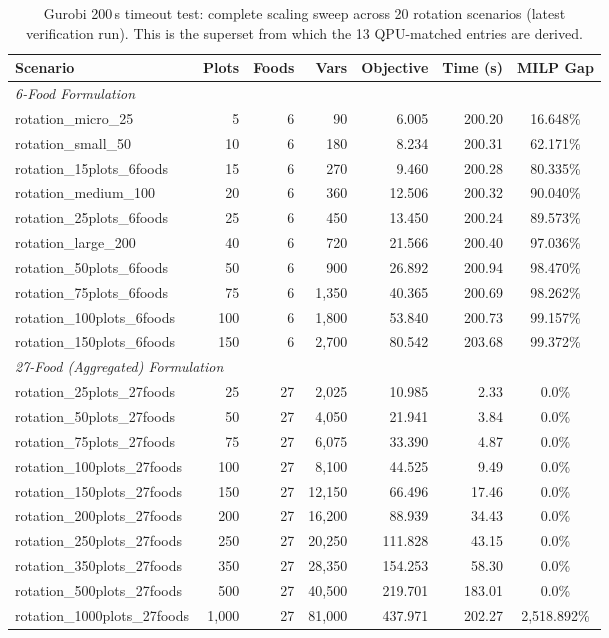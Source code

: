 \documentclass{oqireport}
\begin{document}
\begin{table}[H]
\centering
\caption{Gurobi 200\,s timeout test: complete scaling sweep across 20 rotation scenarios (latest verification run). This is the superset from which the 13 QPU-matched entries are derived.}
\label{tab:gurobi_300s_full}
\small
\begin{adjustbox}{max width=\textwidth}
\begin{tabular}{l r r r r r c}
\toprule
\textbf{Scenario} & \textbf{Plots} & \textbf{Foods} & \textbf{Vars} & \textbf{Objective} & \textbf{Time (s)} & \textbf{MILP Gap} \\
\midrule
\multicolumn{7}{l}{\textit{6-Food Formulation}} \\
\midrule
rotation\_micro\_25 & 5 & 6 & 90 & 6.005 & 200.20 & 16.648\% \\
rotation\_small\_50 & 10 & 6 & 180 & 8.234 & 200.31 & 62.171\% \\
rotation\_15plots\_6foods & 15 & 6 & 270 & 9.460 & 200.28 & 80.335\% \\
rotation\_medium\_100 & 20 & 6 & 360 & 12.506 & 200.32 & 90.040\% \\
rotation\_25plots\_6foods & 25 & 6 & 450 & 13.450 & 200.24 & 89.573\% \\
rotation\_large\_200 & 40 & 6 & 720 & 21.566 & 200.40 & 97.036\% \\
rotation\_50plots\_6foods & 50 & 6 & 900 & 26.892 & 200.94 & 98.470\% \\
rotation\_75plots\_6foods & 75 & 6 & 1,350 & 40.365 & 200.69 & 98.262\% \\
rotation\_100plots\_6foods & 100 & 6 & 1,800 & 53.840 & 200.73 & 99.157\% \\
rotation\_150plots\_6foods & 150 & 6 & 2,700 & 80.542 & 203.68 & 99.372\% \\
\midrule
\multicolumn{7}{l}{\textit{27-Food (Aggregated) Formulation}} \\
\midrule
rotation\_25plots\_27foods & 25 & 27 & 2,025 & 10.985 & 2.33 & 0.0\% \\
rotation\_50plots\_27foods & 50 & 27 & 4,050 & 21.941 & 3.84 & 0.0\% \\
rotation\_75plots\_27foods & 75 & 27 & 6,075 & 33.390 & 4.87 & 0.0\% \\
rotation\_100plots\_27foods & 100 & 27 & 8,100 & 44.525 & 9.49 & 0.0\% \\
rotation\_150plots\_27foods & 150 & 27 & 12,150 & 66.496 & 17.46 & 0.0\% \\
rotation\_200plots\_27foods & 200 & 27 & 16,200 & 88.939 & 34.43 & 0.0\% \\
rotation\_250plots\_27foods & 250 & 27 & 20,250 & 111.828 & 43.15 & 0.0\% \\
rotation\_350plots\_27foods & 350 & 27 & 28,350 & 154.253 & 58.30 & 0.0\% \\
rotation\_500plots\_27foods & 500 & 27 & 40,500 & 219.701 & 183.01 & 0.0\% \\
rotation\_1000plots\_27foods & 1,000 & 27 & 81,000 & 437.971 & 202.27 & 2,518.892\% \\
\bottomrule
\end{tabular}
\end{adjustbox}
\end{table}
\end{document}
